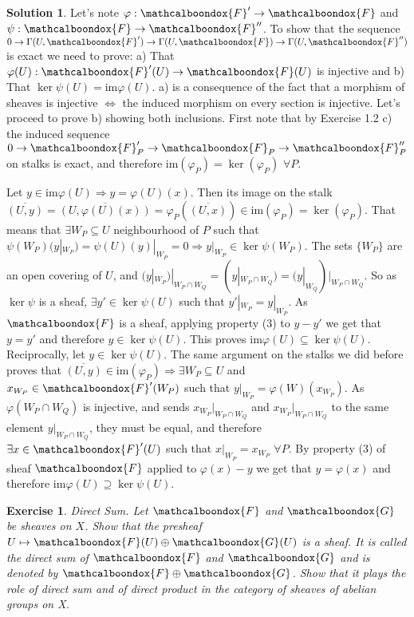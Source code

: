 \documentclass[12pt]{article}
\newcommand{\imp}{\ensuremath{\Rightarrow}}
\newcommand{\ima}{\ensuremath{\mathrm{im}}}
\newtheorem{ex}{Exercise}[section]
\theoremstyle{definition}
\newtheorem*{sol}{Solution}
\newcommand{\sF}{\ensuremath{\mathcalboondox{F}}}
\newcommand{\sG}{\ensuremath{\mathcalboondox{G}}}
\begin{document}
\begin{sol}
	Let's note $\varphi: \sF' \to \sF$ and $\psi: \sF \to \sF''$. To show that the sequence $0 \to \Gamma(U,\sF') \to \Gamma(U, \sF) \to \Gamma(U, \sF'')$ is exact we need to prove: a) That $\varphi(U): \sF'(U) \to \sF(U)$ is injective and b) That $\ker \psi(U) = \ima \varphi(U)$. a) is a consequence of the fact that a morphism of sheaves is injective $\iff$ the induced morphism on every section is injective. Let's proceed to prove b) showing both inclusions. First note that by Exercise 1.2 c) the induced sequence $0 \to \sF'_P \to \sF_P \to \sF''_P$ on stalks is exact, and therefore $\ima (\varphi_P) = \ker (\varphi_P) \, \, \forall P$. 

	Let $y \in \ima \varphi(U) \imp y = \varphi(U)(x)$. Then its image on the stalk $\overline{(U,y)} = \overline{(U, \varphi(U)(x))} = \varphi_P(\overline{(U,x)}) \in \ima (\varphi_P) = \ker (\varphi_P)$. That means that $\exists W_P \subseteq U$ neighbourhood of $P$ such that $\psi(W_P)(y|_{W_P}) = \psi(U)(y)|_{W_P} = 0 \imp y|_{W_P} \in \ker \psi(W_P)$. The sets $\{W_P\}$ are an open covering of $U$, and $(y|_{W_P})|_{W_P \cap W_Q} = (y|_{W_P \cap W_Q}) = (y|_{W_Q})|_{W_P \cap W_Q}$. So as $\ker \psi$ is a sheaf, $\exists y' \in \ker \psi(U)$ such that $y'|_{W_P} = y|_{W_P}$. As $\sF$ is a sheaf, applying property (3) to $y-y'$ we get that $y = y'$ and therefore $y \in \ker \psi(U)$. This proves $\ima \varphi(U) \subseteq \ker \psi(U)$. Reciprocally, let $y \in \ker \psi(U)$. The same argument on the stalks we did before proves that $\overline{(U,y)} \in \ima (\varphi_P) \imp \exists W_P \subseteq U$ and $x_{W_P} \in \sF'(W_P)$ such that $y|_{W_P} = \varphi(W)(x_{W_P})$. As $\varphi(W_P \cap W_Q)$ is injective, and sends $x_{W_P}|_{W_P \cap W_Q}$ and $x_{W_P}|_{W_P \cap W_Q}$ to the same element $y|_{W_P \cap W_Q}$, they must be equal, and therefore $\exists x \in \sF'(U)$ such that $x|_{W_P} = x_{W_P} \, \, \forall P$. By property (3) of sheaf $\sF$ applied to $\varphi(x)-y$ we get that $y = \varphi(x)$ and therefore $\ima \varphi(U) \supseteq \ker \psi(U)$.
\end{sol}

\begin{ex}
	Direct Sum. Let $\sF$ and $\sG$ be sheaves on $X$. Show that the presheaf $U \mapsto \sF(U) \oplus \sG(U)$ is a sheaf. It is called the direct sum of $\sF$ and $\sG$ and is denoted by $\sF \oplus \sG$. Show that it plays the role of direct sum and of direct product in the category of sheaves of abelian groups on X.
\end{ex}
\end{document}

